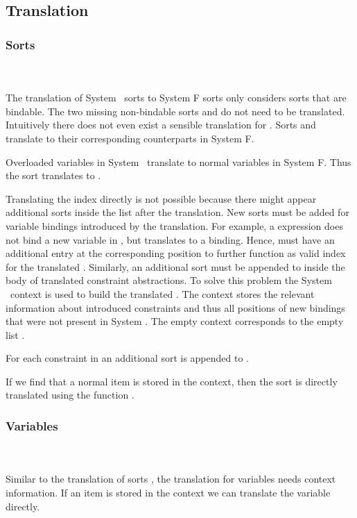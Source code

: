 \subsection{Translation}
\subsubsection{Sorts}\hfill\\\\
The translation of System \Fo\ sorts to System F sorts only considers sorts that are bindable. 
The two missing non-bindable sorts  and  do not need to be translated. 
Intuitively there does not even exist a sensible translation for .
\DPTSort
Sorts  and  translate to their corresponding counterparts in System F. 

\noindent  Overloaded variables in System \Fo\ translate to normal variables in System F. 
Thus the sort  translates to . 

\noindent Translating the index  directly is not possible because there might appear additional sorts inside the list after the translation. 
New sorts must be added for variable bindings introduced by the translation. 
For example, a    \Constr{=}    expression does not bind a new variable in , but translates to a     binding. 
Hence,  must have an additional entry  at the corresponding position to further function as valid index for the translated . 
Similarly, an additional sort  must be appended to  inside the body of translated constraint abstractions.
To solve this problem the System \Fo\ context  is used to build the translated . 
The context stores the relevant information about introduced constraints and thus all positions of new bindings that were not present in System \Fo. 
\DPTSorts
The empty context  corresponds to the empty list \Constr{[]}.

\noindent For each constraint in  an additional sort  is appended to .

\noindent If we find that a normal item is stored in the context, then the sort  is directly translated using the function .

\subsubsection{Variables}\hfill\\\\
Similar to the translation of sorts , the translation for variables  needs context information.  
\DPTVar
If an item is stored in the context we can translate the variable directly. 

